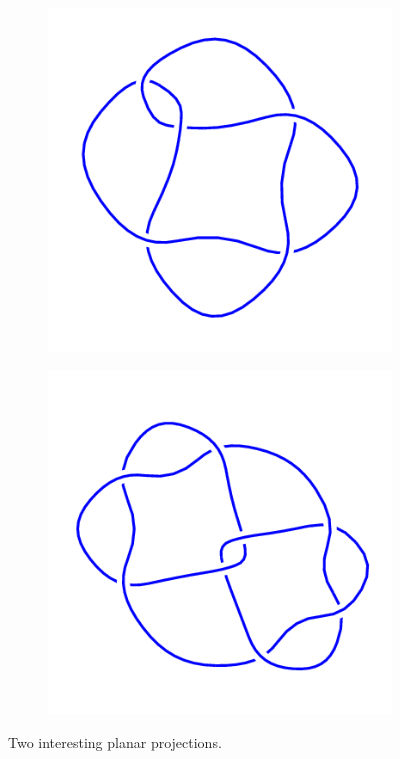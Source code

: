 \documentclass[12pt,letterpaper]{article}
\theoremstyle{definition}
\begin{document}
\begin{figure}[h]
    \centering
    \begin{subfigure}{.25\textwidth}
        \centering
        \includegraphics[width=\textwidth]{knotpics/5_2.png}
    \end{subfigure}
    \hspace{1cm}
    \begin{subfigure}{.25\textwidth}
        \centering
        \includegraphics[width=\textwidth]{knotpics/8_5.png}
    \end{subfigure}
    \caption{Two interesting planar projections.}
\end{figure}
\end{document}
